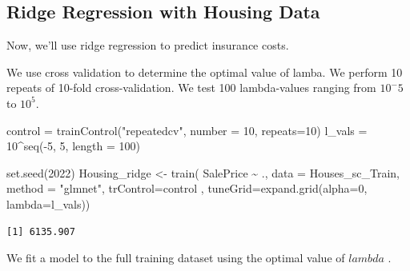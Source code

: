 \documentclass[
  letterpaper,
  DIV=11,
  numbers=noendperiod]{scrreprt}
\newenvironment{Shaded}{\begin{snugshade}}{\end{snugshade}}
\newcommand{\AttributeTok}[1]{\textcolor[rgb]{0.40,0.45,0.13}{#1}}
\newcommand{\DecValTok}[1]{\textcolor[rgb]{0.68,0.00,0.00}{#1}}
\newcommand{\FunctionTok}[1]{\textcolor[rgb]{0.28,0.35,0.67}{#1}}
\newcommand{\NormalTok}[1]{\textcolor[rgb]{0.00,0.23,0.31}{#1}}
\newcommand{\OtherTok}[1]{\textcolor[rgb]{0.00,0.23,0.31}{#1}}
\newcommand{\SpecialCharTok}[1]{\textcolor[rgb]{0.37,0.37,0.37}{#1}}
\newcommand{\StringTok}[1]{\textcolor[rgb]{0.13,0.47,0.30}{#1}}
\begin{document}
\subsection{Ridge Regression with Housing
Data}\label{ridge-regression-with-housing-data}

Now, we'll use ridge regression to predict insurance costs.

We use cross validation to determine the optimal value of lamba. We
perform 10 repeats of 10-fold cross-validation. We test 100
lambda-values ranging from \(10^-5\) to \(10^5\).

\begin{Shaded}
\begin{Highlighting}[]
\NormalTok{control }\OtherTok{=} \FunctionTok{trainControl}\NormalTok{(}\StringTok{"repeatedcv"}\NormalTok{, }\AttributeTok{number =} \DecValTok{10}\NormalTok{, }\AttributeTok{repeats=}\DecValTok{10}\NormalTok{)}
\NormalTok{l\_vals }\OtherTok{=} \DecValTok{10}\SpecialCharTok{\^{}}\FunctionTok{seq}\NormalTok{(}\SpecialCharTok{{-}}\DecValTok{5}\NormalTok{, }\DecValTok{5}\NormalTok{, }\AttributeTok{length =} \DecValTok{100}\NormalTok{)}

\FunctionTok{set.seed}\NormalTok{(}\DecValTok{2022}\NormalTok{)}
\NormalTok{Housing\_ridge }\OtherTok{\textless{}{-}} \FunctionTok{train}\NormalTok{( SalePrice }\SpecialCharTok{\textasciitilde{}}\NormalTok{ ., }\AttributeTok{data =}\NormalTok{ Houses\_sc\_Train, }\AttributeTok{method =} \StringTok{"glmnet"}\NormalTok{, }\AttributeTok{trControl=}\NormalTok{control , }\AttributeTok{tuneGrid=}\FunctionTok{expand.grid}\NormalTok{(}\AttributeTok{alpha=}\DecValTok{0}\NormalTok{, }\AttributeTok{lambda=}\NormalTok{l\_vals))}
\end{Highlighting}
\end{Shaded}

\begin{Shaded}
\end{Shaded}

\begin{verbatim}
[1] 6135.907
\end{verbatim}

We fit a model to the full training dataset using the optimal value of
\(lambda\) .

\begin{Shaded}
\end{Shaded}
\end{document}
